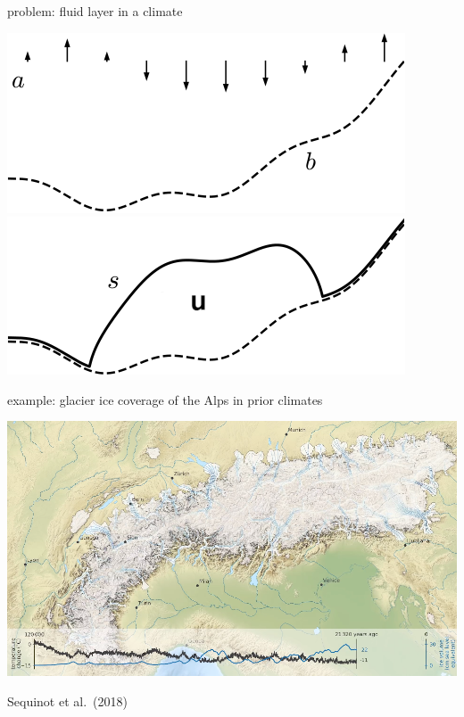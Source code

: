 \documentclass[svgnames,
               hyperref={colorlinks,citecolor=DeepPink4,linkcolor=FireBrick,urlcolor=Maroon},
               usepdftitle=false]  %
               {beamer}
\begin{document}
\begin{frame}{problem: fluid layer in a climate}
\begin{itemize}
ers and ice sheets}, sea ice, lakes
\end{itemize}

\bigskip
\hfill \mbox{\includegraphics[height=0.25\textheight]{../talk-oxford/images/domain-data.png} \hspace{7mm} \includegraphics[height=0.25\textheight]{../talk-oxford/images/domain-velocity.png}}
\end{frame}


\begin{frame}{example: glacier ice coverage of the Alps in prior climates}

\includegraphics[width=1.02\textwidth]{../talk-oxford/images/alps-seguinot2018.png}

\vspace{-2mm}
\hfill {\tiny Sequinot et al.~(2018)}
\end{frame}
\end{document}
